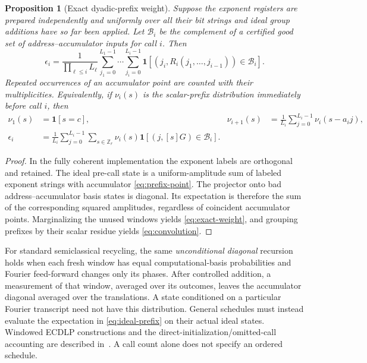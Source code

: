 \documentclass[11pt]{article}
\newtheorem{proposition}[theorem]{Proposition}
\newcommand{\bad}{\mathcal B}
\begin{document}
\begin{proposition}[Exact dyadic-prefix weight]\label{prop:prefix}
Suppose the exponent registers are prepared independently and uniformly over all their bit strings and ideal group additions have so far been applied. Let $\bad_i$ be the complement of a certified good set of address--accumulator inputs for call $i$. Then
\begin{equation}
 \epsilon_i=
 \frac{1}{\prod_{\ell\leq i}L_\ell}
 \sum_{j_1=0}^{L_1-1}\cdots\sum_{j_i=0}^{L_i-1}
 \mathbf1\left[(j_i,R_i(j_1,\ldots,j_{i-1}))\in\bad_i\right].
 \label{eq:exact-weight}
\end{equation}
Repeated occurrences of an accumulator point are counted with their multiplicities. Equivalently, if $\nu_i(s)$ is the scalar-prefix distribution immediately before call $i$, then
\begin{align}
 \nu_1(s)&=\mathbf1[s=c],&
 \nu_{i+1}(s)&=\frac1{L_i}\sum_{j=0}^{L_i-1}\nu_i(s-a_i j),\\
 \epsilon_i&=\frac1{L_i}\sum_{j=0}^{L_i-1}\sum_{s\in\mathbb Z_r}
 \nu_i(s)\mathbf1[(j,[s]G)\in\bad_i].&&
 \label{eq:convolution}
\end{align}
\end{proposition}
\begin{proof}
In the fully coherent implementation the exponent labels are orthogonal and retained. The ideal pre-call state is a uniform-amplitude sum of labeled exponent strings with accumulator \eqref{eq:prefix-point}. The projector onto bad address--accumulator basis states is diagonal. Its expectation is therefore the sum of the corresponding squared amplitudes, regardless of coincident accumulator points. Marginalizing the unused windows yields \eqref{eq:exact-weight}, and grouping prefixes by their scalar residue yields \eqref{eq:convolution}.
\end{proof}

For standard semiclassical recycling, the same \emph{unconditional diagonal} recursion holds when each fresh window has equal computational-basis probabilities and Fourier feed-forward changes only its phases. After controlled addition, a measurement of that window, averaged over its outcomes, leaves the accumulator diagonal averaged over the translations. A state conditioned on a particular Fourier transcript need not have this distribution. General schedules must instead evaluate the expectation in \eqref{eq:ideal-prefix} on their actual ideal states. Windowed ECDLP constructions and the direct-initialization/omitted-call accounting are described in~\cite{schrottenloher,babbush}. A call count alone does not specify an ordered schedule.
\end{document}
